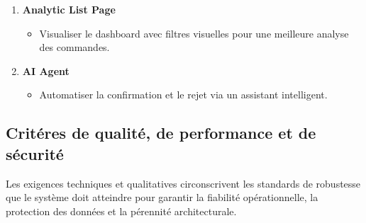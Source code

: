 \documentclass[12pt,a4paper,oneside]{report}
\begin{document}
\begin{enumerate}
  \item \textbf{Analytic List Page}
  \begin{itemize}[label=\textbullet]
    \item Visualiser le dashboard avec filtres visuelles pour une meilleure analyse des commandes.
  \end{itemize}

  \item \textbf{AI Agent}
  \begin{itemize}[label=\textbullet]
    \item Automatiser la confirmation et le rejet via un assistant intelligent.
  \end{itemize}
\end{enumerate}

\subsection{Crit\'eres de qualit\'e, de performance et de s\'ecurit\'e}\label{ch3:besoins-nf}

Les exigences techniques et qualitatives circonscrivent les standards de robustesse que le système doit atteindre pour garantir la fiabilité opérationnelle, la protection des données et la pérennité architecturale.
\end{document}
